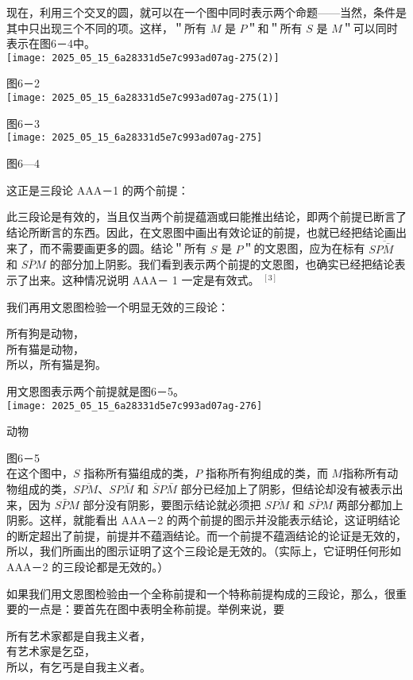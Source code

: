 现在，利用三个交叉的圆，就可以在一个图中同时表示两个命题——当然，条件是其中只出现三个不同的项。这样，＂所有 $M$ 是 $P$＂和＂所有 $S$ 是 $M$＂可以同时表示在图6－4中。\\
\texttt{[image: 2025\_05\_15\_6a28331d5e7c993ad07ag-275(2)]}

图6－2\\
\texttt{[image: 2025\_05\_15\_6a28331d5e7c993ad07ag-275(1)]}

图6－3\\
\texttt{[image: 2025\_05\_15\_6a28331d5e7c993ad07ag-275]}

图6—4

这正是三段论 AAA－1 的两个前提：

此三段论是有效的，当且仅当两个前提蕴涵或曰能推出结论，即两个前提已断言了结论所断言的东西。因此，在文恩图中画出有效论证的前提，也就已经把结论画出来了，而不需要画更多的圆。结论＂所有 $S$ 是 $P$＂的文恩图，应为在标有 $S \overline{P \bar{M}}$ 和 $S \bar{P} M$ 的部分加上阴影。我们看到表示两个前提的文恩图，也确实已经把结论表示了出来。这种情况说明 AAA－ 1 一定是有效式。 ${ }^{[3]}$

我们再用文恩图检验一个明显无效的三段论：

所有狗是动物，\\
所有猫是动物，\\
所以，所有猫是狗。

用文恩图表示两个前提就是图6－5。\\
\texttt{[image: 2025\_05\_15\_6a28331d5e7c993ad07ag-276]}

动物

图6－5\\
在这个图中，$S$ 指称所有猫组成的类，$P$ 指称所有狗组成的类，而 $M$指称所有动物组成的类，$S \overline{P M} 、 S P \bar{M}$ 和 $\bar{S} P \bar{M}$ 部分已经加上了阴影，但结论却没有被表示出来，因为 $S \bar{P} M$ 部分没有阴影，要图示结论就必须把 $S \overline{P M}$ 和 $S \bar{P} M$ 两部分都加上阴影。这样，就能看出 AAA－2 的两个前提的图示并没能表示结论，这证明结论的断定超出了前提，前提并不蕴涵结论。而一个前提不蕴涵结论的论证是无效的，所以，我们所画出的图示证明了这个三段论是无效的。（实际上，它证明任何形如 AAA－2 的三段论都是无效的。）

如果我们用文恩图检验由一个全称前提和一个特称前提构成的三段论，那么，很重要的一点是：要首先在图中表明全称前提。举例来说，要

所有艺术家都是自我主义者，\\
有艺术家是乞亞，\\
所以，有乞丐是自我主义者。

